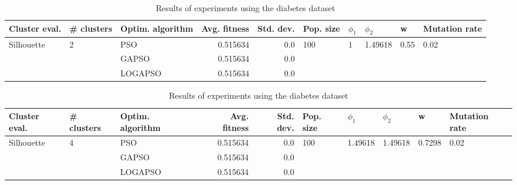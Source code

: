 \documentclass{article}
\begin{document}
\begin{table}
\centering
\caption{Results of experiments using the diabetes dataset}
\begin{tabular}{lllrrlllll}
\toprule
              Cluster eval. &        \# clusters & Optim. algorithm &  Avg. fitness &  Std. dev. &            Pop. size &         $\phi_{1}$ &               $\phi_{2}$ &                     w &         Mutation rate \\
\midrule
\multirow{3}{*}{Silhouette} & \multirow{3}{*}{2} &              PSO &      0.515634 &        0.0 & \multirow{3}{*}{100} & \multirow{3}{*}{1} & \multirow{3}{*}{1.49618} & \multirow{3}{*}{0.55} & \multirow{3}{*}{0.02} \\
                            &                    &            GAPSO &      0.515634 &        0.0 &                      &                    &                          &                       &                       \\
                            &                    &          LOGAPSO &      0.515634 &        0.0 &                      &                    &                          &                       &                       \\
\bottomrule
\end{tabular}
\end{table}
\begin{table}
\centering
\caption{Results of experiments using the diabetes dataset}
\begin{tabular}{lllrrlllll}
\toprule
              Cluster eval. &        \# clusters & Optim. algorithm &  Avg. fitness &  Std. dev. &            Pop. size &               $\phi_{1}$ &               $\phi_{2}$ &                       w &         Mutation rate \\
\midrule
\multirow{3}{*}{Silhouette} & \multirow{3}{*}{4} &              PSO &      0.515634 &        0.0 & \multirow{3}{*}{100} & \multirow{3}{*}{1.49618} & \multirow{3}{*}{1.49618} & \multirow{3}{*}{0.7298} & \multirow{3}{*}{0.02} \\
                            &                    &            GAPSO &      0.515634 &        0.0 &                      &                          &                          &                         &                       \\
                            &                    &          LOGAPSO &      0.515634 &        0.0 &                      &                          &                          &                         &                       \\
\bottomrule
\end{tabular}
\end{table}
\end{document}
